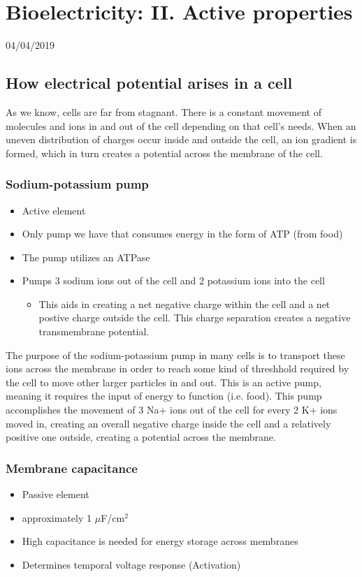 \documentclass[11pt]{book}
\begin{document}
\chapter{Bioelectricity: II. Active properties}
04/04/2019
\minitoc
\newpage

\section{How electrical potential arises in a cell}
As we know, cells are far from stagnant. There is a constant movement of molecules and ions in and out of the cell depending on that cell's needs. When an uneven distribution of charges occur inside and outside the cell, an ion gradient is formed, which in turn creates a potential across the membrane of the cell. 


\subsection{Sodium-potassium pump}
\begin{itemize}
	\item Active element
	\item Only pump we have that consumes energy in the form of ATP (from food)
	\item The pump utilizes an ATPase
	\item Pumps 3 sodium ions out of the cell and 2 potassium ions into the cell
	\begin{itemize}
		\item This aids in creating a net negative charge within the cell and a net postive charge outside the cell. This charge separation creates a negative transmembrane potential.
	\end{itemize}
\end{itemize}

The purpose of the sodium-potassium pump in many cells is to transport these ions across the membrane in order to reach some kind of threshhold required by the cell to move other larger particles in and out. This is an active pump, meaning it requires the input of energy to function (i.e. food). This pump accomplishes the movement of 3 Na+ ions out of the cell for every 2 K+ ions moved in, creating an overall negative charge inside the cell and a relatively positive one outside, creating a potential across the membrane. 

\subsection{Membrane capacitance}
\begin{itemize}
	\item Passive element
	\item approximately 1 $\mu$F/cm$^2$
	\item High capacitance is needed for energy storage across membranes
	\item Determines temporal voltage response (Activation)
\end{itemize}
\end{document}
